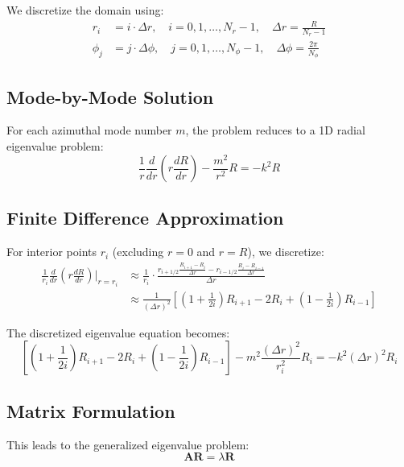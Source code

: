 \documentclass[11pt,a4paper]{article}
\begin{document}
We discretize the domain using:
\begin{align}
r_i &= i \cdot \Delta r, \quad i = 0, 1, \ldots, N_r-1, \quad \Delta r = \frac{R}{N_r-1} \\
\phi_j &= j \cdot \Delta \phi, \quad j = 0, 1, \ldots, N_\phi-1, \quad \Delta \phi = \frac{2\pi}{N_\phi}
\end{align}

\subsection{Mode-by-Mode Solution}

For each azimuthal mode number $m$, the problem reduces to a 1D radial eigenvalue problem:
\begin{equation}
\frac{1}{r}\frac{d}{dr}\left(r \frac{dR}{dr}\right) - \frac{m^2}{r^2}R = -k^2 R \label{eq:radial_eigenvalue}
\end{equation}

\subsection{Finite Difference Approximation}

For interior points $r_i$ (excluding $r = 0$ and $r = R$), we discretize:
\begin{align}
\frac{1}{r_i}\frac{d}{dr}\left(r \frac{dR}{dr}\right)\bigg|_{r=r_i} &\approx \frac{1}{r_i} \cdot \frac{r_{i+1/2} \frac{R_{i+1} - R_i}{\Delta r} - r_{i-1/2} \frac{R_i - R_{i-1}}{\Delta r}}{\Delta r} \\
&\approx \frac{1}{(\Delta r)^2} \left[\left(1 + \frac{1}{2i}\right) R_{i+1} - 2R_i + \left(1 - \frac{1}{2i}\right) R_{i-1}\right]
\end{align}

The discretized eigenvalue equation becomes:
\begin{equation}
\left[\left(1 + \frac{1}{2i}\right) R_{i+1} - 2R_i + \left(1 - \frac{1}{2i}\right) R_{i-1}\right] - m^2 \frac{(\Delta r)^2}{r_i^2} R_i = -k^2 (\Delta r)^2 R_i
\end{equation}

\subsection{Matrix Formulation}

This leads to the generalized eigenvalue problem:
\begin{equation}
\mathbf{A} \mathbf{R} = \lambda \mathbf{R} \label{eq:matrix_eigenvalue}
\end{equation}
\end{document}
